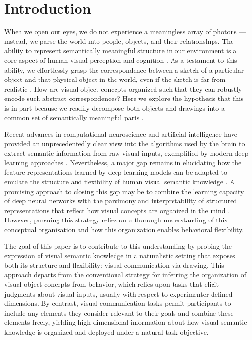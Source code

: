 \documentclass[10pt,letterpaper]{article}
\begin{document}
\section{Introduction}


When we open our eyes, we do not experience a meaningless array of photons --- instead, we parse the world into people, objects, and their relationships. 
The ability to represent semantically meaningful structure in our environment is a core aspect of human visual perception and cognition \cite{navon1977forest}. 
As a testament to this ability, we effortlessly grasp the correspondence between a sketch of a particular object and that physical object in the world, even if the sketch is far from realistic \cite{eitz2012humans}. 
How are visual object concepts organized such that they can robustly encode such abstract correspondences?
Here we explore the hypothesis that this is in part because we readily decompose both objects and drawings into a common set of semantically meaningful parts \cite{biederman1988surface}. 

Recent advances in computational neuroscience and artificial intelligence have provided an unprecedentedly clear view into the algorithms used by the brain to extract semantic information from raw visual inputs, exemplified by modern deep learning approaches \cite{yamins2014performance}.
Nevertheless, a major gap remains in elucidating how the feature representations learned by deep learning models can be adapted to emulate the structure and flexibility of human visual semantic knowledge \cite{lake2017building}.
A promising approach to closing this gap may be to combine the learning capacity of deep neural networks with the parsimony and interpretability of structured representations that reflect how visual concepts are organized in the mind \cite{battaglia2018relational}. 
However, pursuing this strategy relies on a thorough understanding of this conceptual organization and how this organization enables behavioral flexibility.  

The goal of this paper is to contribute to this understanding by probing the expression of visual semantic knowledge in a naturalistic setting that exposes both its structure and flexibility: visual communication via drawing. 
This approach departs from the conventional strategy for inferring the organization of visual object concepts from behavior, which relies upon tasks that elicit judgments about visual inputs, usually with respect to experimenter-defined dimensions. 
By contrast, visual communication tasks permit participants to include any elements they consider relevant to their goals and combine these elements freely, yielding high-dimensional information about how visual semantic knowledge is organized and deployed under a natural task objective. 
\end{document}
